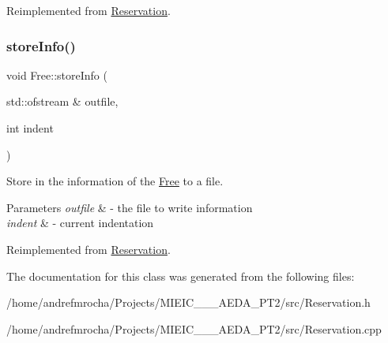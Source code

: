 Reimplemented from \mbox{\hyperlink{class_reservation_acff32024a350c2156af9f74522c59b7b}{Reservation}}.

\mbox{\label{class_free_a5eec9da16ebf4f388d16dd270bd93b64}} 
\subsubsection{\texorpdfstring{store\+Info()}{storeInfo()}}
{\footnotesize\ttfamily void Free\+::store\+Info (\begin{DoxyParamCaption}\item[{std\+::ofstream \&}]{outfile,  }\item[{int}]{indent }\end{DoxyParamCaption})\hspace{0.3cm}{\ttfamily [virtual]}}



Store in the information of the \mbox{\hyperlink{class_free}{Free}} to a file. 


\begin{DoxyParams}{Parameters}
{\em outfile} & -\/ the file to write information \\
\hline
{\em indent} & -\/ current indentation \\
\hline
\end{DoxyParams}


Reimplemented from \mbox{\hyperlink{class_reservation_a8ec83fe2eb15294c3a51a9998ed17df7}{Reservation}}.



The documentation for this class was generated from the following files\+:\begin{DoxyCompactItemize}
\item 
/home/andrefmrocha/\+Projects/\+M\+I\+E\+I\+C\+\_\+\_\+\_\+\+A\+E\+D\+A\+\_\+\+P\+T2/src/Reservation.\+h\item 
/home/andrefmrocha/\+Projects/\+M\+I\+E\+I\+C\+\_\+\_\+\_\+\+A\+E\+D\+A\+\_\+\+P\+T2/src/Reservation.\+cpp\end{DoxyCompactItemize}
